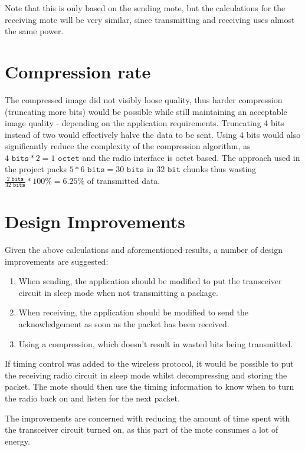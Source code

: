 Note that this is only based on the sending mote, but the calculations for the receiving mote will be very similar, since transmitting and receiving uses almost the same power. 

\section{Compression rate}

The compressed image did not visibly loose quality, thus harder compression (truncating more bits) would be possible while still maintaining an acceptable image quality - depending on the application requirements.
Truncating 4 bits instead of two would effectively halve the data to be sent.
Using 4 bits would also significantly reduce the complexity of the compression algorithm, as $4 \texttt{ bits} * 2= 1 \texttt{ octet}$ and the radio interface is octet based.
The approach used in the project packs $5 * 6\texttt{ bits} = 30\texttt{ bits}$ in $32 \texttt{ bit}$ chunks thus wasting $\frac{2\texttt{ bits}}{32\texttt{ bits}}*100\% = 6.25\%$ of transmitted data.

\section{Design Improvements}

Given the above calculations and aforementioned results, a number of design improvements are suggested: 

\begin{enumerate}
\item When sending, the application should be modified to put the transceiver circuit in sleep mode when not transmitting a package. 
\item When receiving, the application should be modified to send the acknowledgement as soon as the packet has been received.
\item Using a compression, which doesn't result in wasted bits being transmitted. 
\end{enumerate} 

If timing control was added to the wireless protocol, it would be possible to put the receiving radio circuit in sleep mode whilst decompressing and storing the packet. The mote should then use the timing information to know when to turn the radio back on and listen for the next packet.

The improvements are concerned with reducing the amount of time spent with the transceiver circuit turned on, as this part of the mote consumes a lot of energy.  
